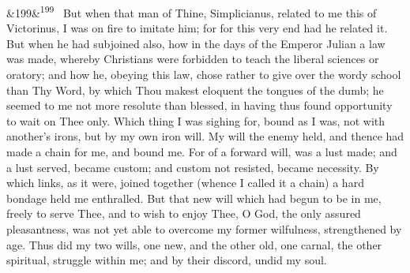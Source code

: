 \documentclass[12pt]{article}
\newcommand{\para}[1][]{\par\noindent\ifx&#1&\else\textsuperscript{\footnotesize #1}~\fi}
\begin{document}
\para[199] But when that man of Thine, Simplicianus, related to me this of Victorinus, I was on fire to imitate him; for for this very end had he related it. But when he had subjoined also, how in the days of the Emperor Julian a law was made, whereby Christians were forbidden to teach the liberal sciences or oratory; and how he, obeying this law, chose rather to give over the wordy school than Thy Word, by which Thou makest eloquent the tongues of the dumb; he seemed to me not more resolute than blessed, in having thus found opportunity to wait on Thee only. Which thing I was sighing for, bound as I was, not with another's irons, but by my own iron will. My will the enemy held, and thence had made a chain for me, and bound me. For of a forward will, was a lust made; and a lust served, became custom; and custom not resisted, became necessity. By which links, as it were, joined together (whence I called it a chain) a hard bondage held me enthralled. But that new will which had begun to be in me, freely to serve Thee, and to wish to enjoy Thee, O God, the only assured pleasantness, was not yet able to overcome my former wilfulness, strengthened by age. Thus did my two wills, one new, and the other old, one carnal, the other spiritual, struggle within me; and by their discord, undid my soul.
\end{document}
